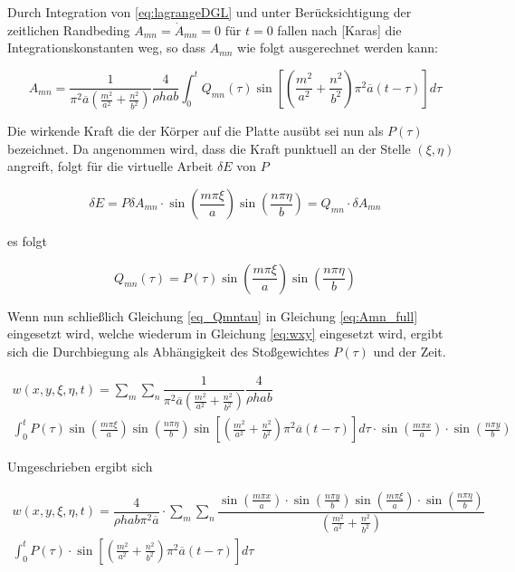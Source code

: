 Durch Integration von \ref{eq:lagrangeDGL} und unter Berücksichtigung der zeitlichen Randbeding $A_{mn} = \dot{A}_{mn} = 0 \text{ für } t = 0$ fallen nach [Karas] die Integrationskonstanten weg, so dass $A_{mn}$ wie folgt ausgerechnet werden kann:

\begin{equation}
A_{mn} = \dfrac{1}{\pi^2 \overline{a}  \left(\frac{m^2}{a^2} + \frac{n^2}{b^2} \right)} \dfrac{4}{\rho h a b} \int_0^t	Q_{mn}(\tau) \sin \left[ \left(\frac{m^2}{a^2} + \frac{n^2}{b^2} \right) \pi^2 \overline{a} (t-\tau)\right] d\tau
\label{eq:Amn_full}
\end{equation}


Die wirkende Kraft die der Körper auf die Platte ausübt sei nun als $P(\tau)$ bezeichnet. 
Da angenommen wird, dass die Kraft punktuell an der Stelle $(\xi, \eta)$ angreift, folgt für die virtuelle Arbeit $\delta E$ von $P$

\begin{equation}
\delta E = P \delta A_{mn} \cdot \sin \left( \frac{m \pi \xi}{a} \right) \sin \left( \frac{n \pi \eta}{b} \right) = Q_{mn} \cdot \delta A_{mn}
\end{equation} 

es folgt

\begin{equation}
Q_{mn}(\tau) = P(\tau) \sin \left( \frac{m \pi \xi}{a} \right) \sin \left( \frac{n \pi \eta}{b} \right)
\label{eq_Qmntau}
\end{equation}



Wenn nun schließlich Gleichung \ref{eq_Qmntau} in Gleichung \ref{eq:Amn_full} eingesetzt wird, welche wiederum in Gleichung \ref{eq:wxy} eingesetzt wird, ergibt sich die Durchbiegung als Abhängigkeit des Stoßgewichtes $P(\tau)$ und der Zeit.

\begin{multline}
w(x,y,\xi, \eta, t) = \sum_m \sum_n 
\dfrac{1}{\pi^2 \overline{a}  \left(\frac{m^2}{a^2} + \frac{n^2}{b^2} \right)} \dfrac{4}{\rho h a b} \\ \int_0^t
 P(\tau) \sin \left( \frac{m \pi \xi}{a} \right) \sin \left( \frac{n \pi \eta}{b} \right)
\sin \left[ \left(\frac{m^2}{a^2} + \frac{n^2}{b^2} \right) \pi^2 \overline{a} (t-\tau)\right] d\tau
\cdot \sin\left(\frac{m \pi x}{a}\right) \cdot \sin\left(\frac{n \pi y}{b}\right)
\end{multline}

Umgeschrieben ergibt sich

\begin{multline}
	w(x,y,\xi, \eta, t) = \dfrac{4}{\rho h a b \pi^2 \overline{a}} \cdot \sum_m \sum_n 
	\dfrac{\sin\left(\frac{m \pi x}{a}\right) \cdot \sin\left(\frac{n \pi y}{b}\right) \sin\left(\frac{m \pi \xi}{a}\right) \cdot \sin\left(\frac{n \pi \eta}{b}\right)	}{\left(\frac{m^2}{a^2} + \frac{n^2}{b^2} \right)}  \\
	\int_0^t
	P(\tau)\cdot \sin \left[ \left(\frac{m^2}{a^2} + \frac{n^2}{b^2} \right) \pi^2 \overline{a} (t-\tau)\right] d\tau
	\label{eq:wxyxietat}
\end{multline}


